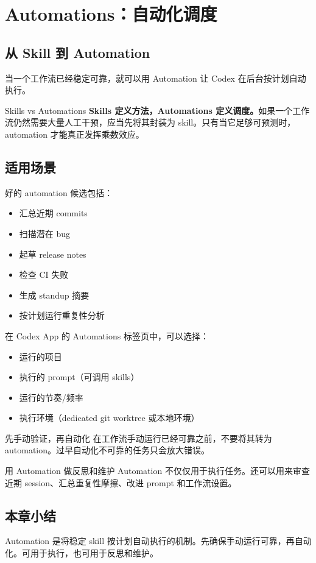 \section{Automations：自动化调度}

\subsection{从 Skill 到 Automation}

当一个工作流已经稳定可靠，就可以用 Automation 让 Codex 在后台按计划自动执行。

\begin{importantbox}{Skills vs Automations}
\textbf{Skills 定义方法，Automations 定义调度。}如果一个工作流仍然需要大量人工干预，应当先将其封装为 skill。只有当它足够可预测时，automation 才能真正发挥乘数效应。
\end{importantbox}

\subsection{适用场景}

好的 automation 候选包括：

\begin{itemize}
    \item 汇总近期 commits
    \item 扫描潜在 bug
    \item 起草 release notes
    \item 检查 CI 失败
    \item 生成 standup 摘要
    \item 按计划运行重复性分析
\end{itemize}

在 Codex App 的 Automations 标签页中，可以选择：
\begin{itemize}
    \item 运行的项目
    \item 执行的 prompt（可调用 skills）
    \item 运行的节奏/频率
    \item 执行环境（dedicated git worktree 或本地环境）
\end{itemize}

\begin{warningbox}{先手动验证，再自动化}
在工作流手动运行已经可靠之前，不要将其转为 automation。过早自动化不可靠的任务只会放大错误。
\end{warningbox}

\begin{knowledgebox}{用 Automation 做反思和维护}
Automation 不仅仅用于执行任务。还可以用来审查近期 session、汇总重复性摩擦、改进 prompt 和工作流设置。
\end{knowledgebox}

\subsection{本章小结}

Automation 是将稳定 skill 按计划自动执行的机制。先确保手动运行可靠，再自动化。可用于执行，也可用于反思和维护。

